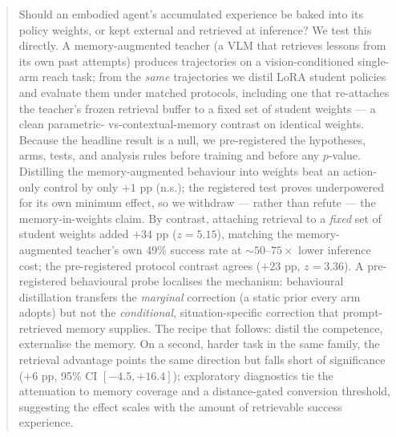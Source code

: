 \begin{abstract}
Should an embodied agent's accumulated experience be baked into its
policy weights, or kept external and retrieved at inference? We test
this directly. A memory-augmented teacher (a VLM that retrieves lessons
from its own past attempts) produces trajectories on a
vision-conditioned single-arm reach task; from the \emph{same} trajectories
we distil LoRA student policies and evaluate them under matched
protocols, including one that re-attaches the teacher's frozen
retrieval buffer to a fixed set of student weights --- a clean parametric-%
vs-contextual-memory contrast on identical weights. Because the
headline result is a null, we pre-registered the hypotheses, arms,
tests, and analysis rules before training and before any $p$-value.
Distilling the memory-augmented behaviour into weights beat an
action-only control by only $+1$ pp (n.s.); the registered test proves
underpowered for its own minimum effect, so we withdraw --- rather than
refute --- the memory-in-weights claim. By contrast, attaching retrieval
to a \emph{fixed} set of student weights added $+34$ pp ($z=5.15$), matching the
memory-augmented teacher's own 49\% success rate at ${\sim}50$--$75\times$ lower
inference cost; the pre-registered protocol contrast agrees
($+23$ pp, $z=3.36$). A pre-registered behavioural
probe localises the mechanism: behavioural distillation transfers the
\emph{marginal} correction (a static prior every arm adopts) but not the
\emph{conditional}, situation-specific correction that prompt-retrieved
memory supplies. The recipe that follows: distil the competence,
externalise the memory. On a second, harder task in the same family, the
retrieval advantage points the same direction but falls short of
significance ($+6$ pp, 95\% CI $[-4.5, +16.4]$); exploratory diagnostics tie
the attenuation to memory coverage and a distance-gated conversion
threshold, suggesting the effect scales with the amount of retrievable
success experience.
\end{abstract}
